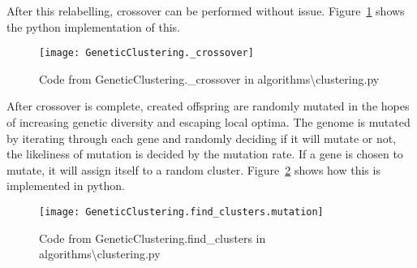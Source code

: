 \noindent
After this relabelling, crossover can be performed without issue.
Figure~\ref{fig:GeneticClustering._crossover} shows the python implementation of this.
\begin{figure}[H]
    \centering
    \texttt{[image: GeneticClustering.\_crossover]}
    \caption{Code from GeneticClustering.\_crossover in algorithms\textbackslash clustering.py}
    \label{fig:GeneticClustering._crossover}
\end{figure}

After crossover is complete, created offspring are randomly mutated in the hopes of increasing genetic diversity
and escaping local optima.
The genome is mutated by iterating through each gene and randomly deciding if it will mutate or not, the likeliness
of mutation is decided by the mutation rate.
If a gene is chosen to mutate, it will assign itself to a random cluster.
Figure~\ref{fig:GeneticClustering.find_clusters.mutation} shows how this is implemented in python.
\begin{figure}[H]
    \centering
    \texttt{[image: GeneticClustering.find\_clusters.mutation]}
    \caption{Code from GeneticClustering.find\_clusters in algorithms\textbackslash clustering.py}
    \label{fig:GeneticClustering.find_clusters.mutation}
\end{figure}


